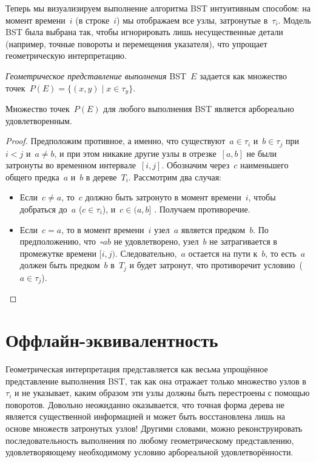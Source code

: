 \documentclass[a4paper,11pt]{article}
\begin{document}
Теперь мы визуализируем выполнение алгоритма BST интуитивным способом: на момент времени~$i$ (в строке~$i$) мы отображаем все узлы, затронутые в~$\tau_i$. Модель BST была выбрана так, чтобы игнорировать лишь несущественные детали (например, точные повороты и перемещения указателя), что упрощает геометрическую интерпретацию.

\begin{definition}
	\emph{Геометрическое представление выполнения} BST~$E$ задается как множество точек~$P(E) = \{(x, y) \mid x \in \tau_y\}$.
\end{definition}

\begin{lemma} \label{lemma:bst_arborall}
Множество точек~$P(E)$ для любого выполнения BST является арбореально удовлетворенным.
\end{lemma}

\begin{proof}
	Предположим противное, а именно, что существуют~$a \in \tau_i$ и~$b \in \tau_j$ при~$i < j$ и~$a \neq b$, и при этом никакие другие узлы в отрезке~$[a, b]$ не были затронуты во временном интервале~$[i, j]$. Обозначим через~$c$ наименьшего общего предка~$a$ и~$b$ в дереве~$T_i$. Рассмотрим два случая:

\begin{itemize}
	\item Если~$c \neq a$, то~$c$ должно быть затронуто в момент времени~$i$, чтобы добраться до~$a$ ($c \in \tau_i$), и~$c \in (a, b]$ . Получаем противоречие.
    
	\item Если~$c = a$, то в момент времени~$i$ узел~$a$ является предком~$b$. По предположению, что~$\square ab$ не удовлетворено, узел~$b$ не затрагивается в промежутке времени $[i, j)$. Следовательно,~$a$ остается на пути к~$b$, то есть~$a$ должен быть предком~$b$ в~$T_j$ и будет затронут, что противоречит условию~($a \in \tau_j$).
\end{itemize}
\end{proof}

\section{Оффлайн-эквивалентность}

Геометрическая интерпретация представляется как весьма упрощённое представление выполнения BST, так как она отражает только множество узлов в~$\tau_i$ и не указывает, каким образом эти узлы должны быть перестроены с помощью поворотов.  
Довольно неожиданно оказывается, что точная форма дерева не является существенной информацией и может быть восстановлена лишь на основе множеств затронутых узлов! Другими словами, можно реконструировать последовательность выполнения по любому геометрическому представлению, удовлетворяющему необходимому условию арбореальной удовлетворённости.
\end{document}
